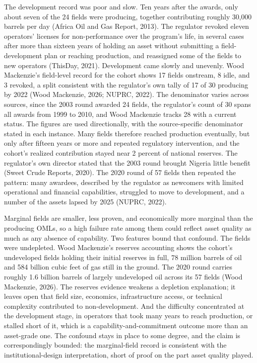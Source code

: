 The development record was poor and slow. Ten years after the awards,
only about seven of the 24 fields were producing, together contributing
roughly 30,000 barrels per day (Africa Oil and Gas Report, 2013). The
regulator revoked eleven operators' licenses for non-performance over
the program's life, in several cases after more than sixteen years of
holding an asset without submitting a field-development plan or reaching
production, and reassigned some of the fields to new operators (ThisDay,
2021). Development came slowly and unevenly. Wood Mackenzie's
field-level record for the cohort shows 17 fields onstream, 8 idle, and
3 revoked, a split consistent with the regulator's own tally of 17 of 30
producing by 2022 (Wood Mackenzie, 2026; NUPRC, 2022). The denominator
varies across sources, since the 2003 round awarded 24 fields, the
regulator's count of 30 spans all awards from 1999 to 2010, and Wood
Mackenzie tracks 28 with a current status. The figures are used
directionally, with the source-specific denominator stated in each
instance. Many fields therefore reached production eventually, but only
after fifteen years or more and repeated regulatory intervention, and
the cohort's realized contribution stayed near 2 percent of national
reserves. The regulator's own director stated that the 2003 round
brought Nigeria little benefit (Sweet Crude Reports, 2020). The 2020
round of 57 fields then repeated the pattern: many awardees, described
by the regulator as newcomers with limited operational and financial
capabilities, struggled to move to development, and a number of the
assets lapsed by 2025 (NUPRC, 2022).

Marginal fields are smaller, less proven, and economically more marginal
than the producing OMLs, so a high failure rate among them could reflect
asset quality as much as any absence of capability. Two features bound
that confound. The fields were undepleted. Wood Mackenzie's reserves
accounting shows the cohort's undeveloped fields holding their initial
reserves in full, 78 million barrels of oil and 584 billion cubic feet
of gas still in the ground. The 2020 round carries roughly 1.6 billion
barrels of largely undeveloped oil across its 57 fields (Wood Mackenzie,
2026). The reserves evidence weakens a depletion explanation; it leaves
open that field size, economics, infrastructure access, or technical
complexity contributed to non-development. And the difficulty
concentrated at the development stage, in operators that took many years
to reach production, or stalled short of it, which is a
capability-and-commitment outcome more than an asset-grade one. The
confound stays in place to some degree, and the claim is correspondingly
bounded: the marginal-field record is consistent with the
institutional-design interpretation, short of proof on the part asset
quality played.

